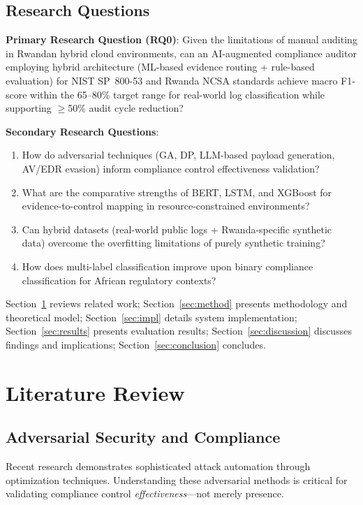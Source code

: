 \documentclass[futureinternet,article,submit,pdftex,moreauthors]{Definitions/mdpi}
\begin{document}
\subsection{Research Questions}

\textbf{Primary Research Question (RQ0)}: Given the limitations of manual auditing in Rwandan
hybrid cloud environments, can an AI-augmented compliance auditor employing hybrid architecture
(ML-based evidence routing + rule-based evaluation) for NIST SP~800-53 and Rwanda NCSA
standards achieve macro F1-score within the 65--80\% target range for real-world log
classification while supporting $\geq$50\% audit cycle reduction?

\textbf{Secondary Research Questions}:
\begin{enumerate}
\item[\textbf{RQ1}] How do adversarial techniques (GA, DP, LLM-based payload generation,
AV/EDR evasion) inform compliance control effectiveness validation?
\item[\textbf{RQ2}] What are the comparative strengths of BERT, LSTM, and XGBoost for
evidence-to-control mapping in resource-constrained environments?
\item[\textbf{RQ3}] Can hybrid datasets (real-world public logs + Rwanda-specific synthetic
data) overcome the overfitting limitations of purely synthetic training?
\item[\textbf{RQ4}] How does multi-label classification improve upon binary compliance
classification for African regulatory contexts?
\end{enumerate}

Section~\ref{sec:lit} reviews related work; Section~\ref{sec:method} presents methodology
and theoretical model; Section~\ref{sec:impl} details system implementation;
Section~\ref{sec:results} presents evaluation results; Section~\ref{sec:discussion} discusses
findings and implications; Section~\ref{sec:conclusion} concludes.

\section{Literature Review}
\label{sec:lit}

\subsection{Adversarial Security and Compliance}

Recent research demonstrates sophisticated attack automation through optimization techniques.
Understanding these adversarial methods is critical for validating compliance control
\textit{effectiveness}---not merely presence.
\end{document}
